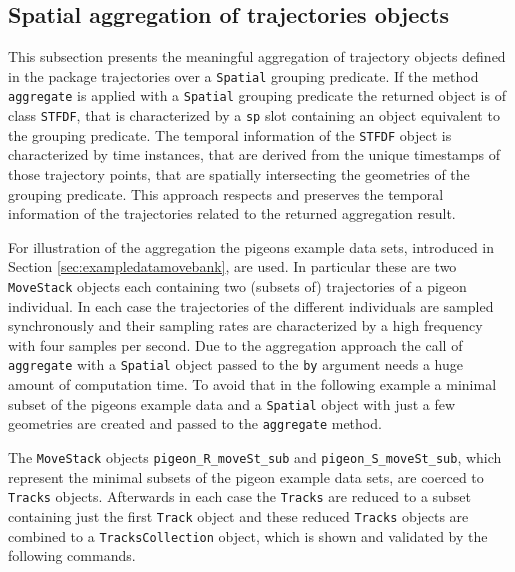 \documentclass[12pt, oneside, a4paper]{scrbook}
\newcommand{\pkg}[1]{{\normalfont\fontseries{b}\selectfont #1}}
\let\code=\texttt
\begin{document}
\subsection{Spatial aggregation of \pkg{trajectories} objects}
\label{subsec:aggregationbysp}

This subsection presents the meaningful aggregation of trajectory objects defined in the package \pkg{trajectories} over a \code{Spatial} grouping predicate. If the method \code{aggregate} is applied with a \code{Spatial} grouping predicate the returned object is of class \code{STFDF}, that is characterized by a \code{sp} slot containing an object equivalent to the grouping predicate. The temporal information of the \code{STFDF} object is characterized by time instances, that are derived from the unique timestamps of those trajectory points, that are spatially intersecting the geometries of the grouping predicate. This approach respects and preserves the temporal information of the trajectories related to the returned aggregation result.
\par\medskip

For illustration of the aggregation the pigeons example data sets, introduced in Section \ref{sec:exampledatamovebank}, are used. In particular these are two \code{MoveStack} objects each containing two (subsets of) trajectories of a pigeon individual. In each case the trajectories of the different individuals are sampled synchronously and their sampling rates are characterized by a high frequency with four samples per second. 
Due to the aggregation approach the call of \code{aggregate} with a \code{Spatial} object passed to the \code{by} argument needs a huge amount of computation time. To avoid that in the following example a minimal subset of the pigeons example data and a \code{Spatial} object with just a few geometries are created and passed to the \code{aggregate} method.
\par\medskip

The \code{MoveStack} objects \code{pigeon\_R\_moveSt\_sub} and \code{pigeon\_S\_moveSt\_sub}, which represent the minimal subsets of the pigeon example data sets, are coerced to \code{Tracks} objects. Afterwards in each case the \code{Tracks} are reduced to a subset containing just the first \code{Track} object and these reduced \code{Tracks} objects are combined to a \code{TracksCollection} object, which is shown and validated by the following commands.
\par\medskip
\end{document}
